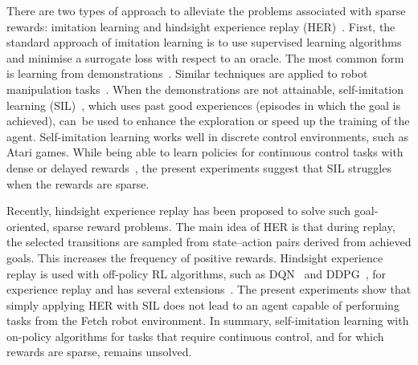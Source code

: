 There are two types of approach to alleviate the problems associated with sparse rewards: imitation learning and hindsight experience replay (HER)~\cite{andrychowicz2017hindsight}. First, the standard approach of imitation learning is to use supervised learning algorithms and minimise a surrogate loss with respect to an oracle. The most common form is learning from demonstrations~\cite{hester2018deep,gao2018reinforcement}. Similar techniques are applied to robot manipulation tasks~\cite{rajeswaran2017learning,vevcerik2017leveraging,nair2018overcoming,james2018task}. When the demonstrations are not attainable, self-imitation learning (SIL)~\cite{oh2018self}, which uses past good experiences (episodes in which the goal is achieved), can~be used to enhance the exploration or speed up the training of the agent. {Self-imitation learning} works well in discrete control environments, such as Atari games. While being able to learn policies for continuous control tasks with dense or delayed rewards~\cite{oh2018self}, the present experiments suggest that SIL struggles when the rewards are sparse. 

Recently, {hindsight experience replay} has been proposed to solve such goal-oriented, sparse reward problems. The main idea of HER is that during replay, the selected transitions are sampled from state--action pairs derived from {achieved goals}. This increases the frequency of positive rewards. {Hindsight experience replay} is used with off-policy RL algorithms, such as DQN~\cite{mnih2015human} and DDPG~\cite{lillicrap2015continuous}, for experience replay and has several extensions~\cite{schaul2015prioritized,liu2018competitive}. The present experiments show that simply applying HER with SIL does not lead to an agent capable of performing tasks from the Fetch robot environment. In summary, self-imitation learning with on-policy algorithms for tasks that require continuous control, and for which rewards are sparse, remains unsolved.

